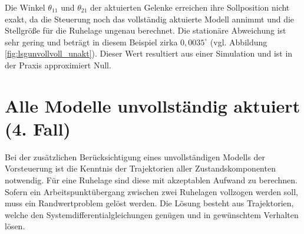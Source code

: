 Die Winkel $\theta_{11}$ und $\theta_{21}$ der aktuierten Gelenke erreichen ihre Sollposition nicht exakt, da die Steuerung noch das vollständig aktuierte Modell annimmt und die Stellgröße für die Ruhelage ungenau berechnet. Die stationäre Abweichung ist sehr gering und beträgt in diesem Beispiel zirka $0,0035^\circ$ (vgl. Abbildung \ref{fig:lsgunvollvoll_unakt}). Dieser Wert resultiert aus einer Simulation und ist in der  Praxis approximiert Null.

\newpage
\section{Alle Modelle unvollständig aktuiert (4. Fall)}

Bei der zusätzlichen Berücksichtigung eines unvollständigen Modells der Vorsteuerung ist die Kenntnis der Trajektorien aller Zustandskomponenten notwendig. Für eine Ruhelage sind diese mit akzeptablen Aufwand zu berechnen. Sofern ein Arbeitspunktübergang zwischen zwei Ruhelagen vollzogen werden soll, muss ein Randwertproblem gelöst werden. Die Lösung besteht aus Trajektorien, welche den Systemdifferentialgleichungen genügen und in gewünschtem Verhalten lösen. %